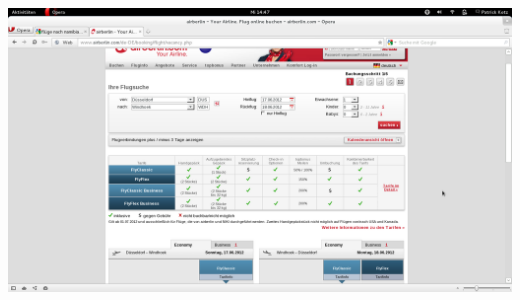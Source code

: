 \documentclass[11pt]{article}
\begin{document}
\includegraphics[scale=0.9]{Flug_Air_Berlin/Bildschirmfoto_am_2012-06-13_14_47_43.png} 
\end{document}
